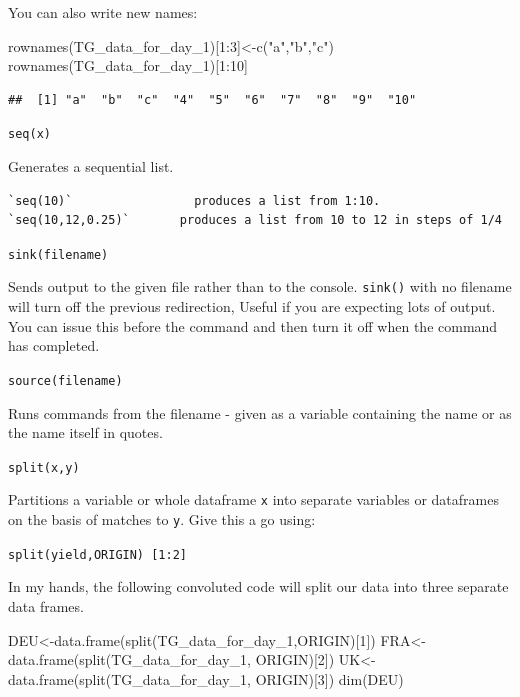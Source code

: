 \documentclass[
]{book}
\newenvironment{Shaded}{\begin{snugshade}}{\end{snugshade}}
\newcommand{\DecValTok}[1]{\textcolor[rgb]{0.00,0.00,0.81}{#1}}
\newcommand{\FunctionTok}[1]{\textcolor[rgb]{0.00,0.00,0.00}{#1}}
\newcommand{\NormalTok}[1]{#1}
\newcommand{\OtherTok}[1]{\textcolor[rgb]{0.56,0.35,0.01}{#1}}
\newcommand{\SpecialCharTok}[1]{\textcolor[rgb]{0.00,0.00,0.00}{#1}}
\newcommand{\StringTok}[1]{\textcolor[rgb]{0.31,0.60,0.02}{#1}}
\begin{document}
You can also write new names:

\begin{Shaded}
\begin{Highlighting}[]
\FunctionTok{rownames}\NormalTok{(TG\_data\_for\_day\_1)[}\DecValTok{1}\SpecialCharTok{:}\DecValTok{3}\NormalTok{]}\OtherTok{\textless{}{-}}\FunctionTok{c}\NormalTok{(}\StringTok{"a"}\NormalTok{,}\StringTok{"b"}\NormalTok{,}\StringTok{"c"}\NormalTok{)}
\FunctionTok{rownames}\NormalTok{(TG\_data\_for\_day\_1)[}\DecValTok{1}\SpecialCharTok{:}\DecValTok{10}\NormalTok{]}
\end{Highlighting}
\end{Shaded}

\begin{verbatim}
##  [1] "a"  "b"  "c"  "4"  "5"  "6"  "7"  "8"  "9"  "10"
\end{verbatim}

\texttt{seq(x)}

Generates a sequential list.

\begin{verbatim}
`seq(10)`                 produces a list from 1:10. 
`seq(10,12,0.25)`       produces a list from 10 to 12 in steps of 1/4
\end{verbatim}

\texttt{sink(filename)}

Sends output to the given file rather than to the console. \texttt{sink()} with no filename will turn off the previous redirection, Useful if you are expecting lots of output. You can issue this before the command and then turn it off when the command has completed.

\texttt{source(filename)}

Runs commands from the filename - given as a variable containing the name or as the name itself in quotes.

\texttt{split(x,y)}

Partitions a variable or whole dataframe \texttt{x} into separate variables or dataframes on the basis of matches to \texttt{y}. Give this a go using:

\texttt{split(yield,ORIGIN)\ {[}1:2{]}}

In my hands, the following convoluted code will split our data into three separate data frames.

\begin{Shaded}
\begin{Highlighting}[]
\NormalTok{DEU}\OtherTok{\textless{}{-}}\FunctionTok{data.frame}\NormalTok{(}\FunctionTok{split}\NormalTok{(TG\_data\_for\_day\_1,ORIGIN)[}\DecValTok{1}\NormalTok{])}
\NormalTok{FRA}\OtherTok{\textless{}{-}}\FunctionTok{data.frame}\NormalTok{(}\FunctionTok{split}\NormalTok{(TG\_data\_for\_day\_1, ORIGIN)[}\DecValTok{2}\NormalTok{])}
\NormalTok{UK}\OtherTok{\textless{}{-}}\FunctionTok{data.frame}\NormalTok{(}\FunctionTok{split}\NormalTok{(TG\_data\_for\_day\_1, ORIGIN)[}\DecValTok{3}\NormalTok{])}
\FunctionTok{dim}\NormalTok{(DEU)}
\end{Highlighting}
\end{Shaded}
\end{document}

